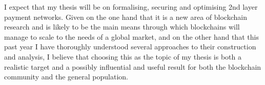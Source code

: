     I expect that my thesis will be on formalising, securing and optimising 2nd
    layer payment networks. Given on the one hand that it is a new area of
    blockchain research and is likely to be the main means through which
    blockchains will manage to scale to the needs of a global market, and on the
    other hand that this past year I have thoroughly understood several
    approaches to their construction and analysis, I believe that choosing this
    as the topic of my thesis is both a realistic target and a possibly
    influential and useful result for both the blockchain community and the
    general population.
